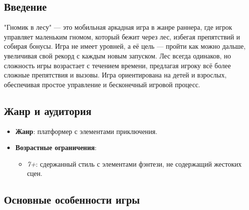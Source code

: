 \documentclass{article}
\begin{document}
\subsection{Введение}

"Гномик в лесу" — это мобильная аркадная игра в жанре раннера, где игрок управляет маленьким гномом, который бежит через лес, избегая препятствий и собирая бонусы. Игра не имеет уровней, а её цель — пройти как можно дальше, увеличивая свой рекорд с каждым новым запуском. Лес всегда одинаков, но сложность игры возрастает с течением времени, предлагая игроку всё более сложные препятствия и вызовы. Игра ориентирована на детей и взрослых, обеспечивая простое управление и бесконечный игровой процесс.

\subsection{Жанр и аудитория}

\begin{itemize}
    \item \textbf{Жанр}: платформер с элементами приключения.
    \item \textbf{Возрастные ограничения}:
    \begin{itemize}
        \item \textit{7+}: сдержанный стиль с элементами фэнтези, не содержащий жестоких сцен.
    \end{itemize}
\end{itemize}

\subsection{Основные особенности игры}
\end{document}
